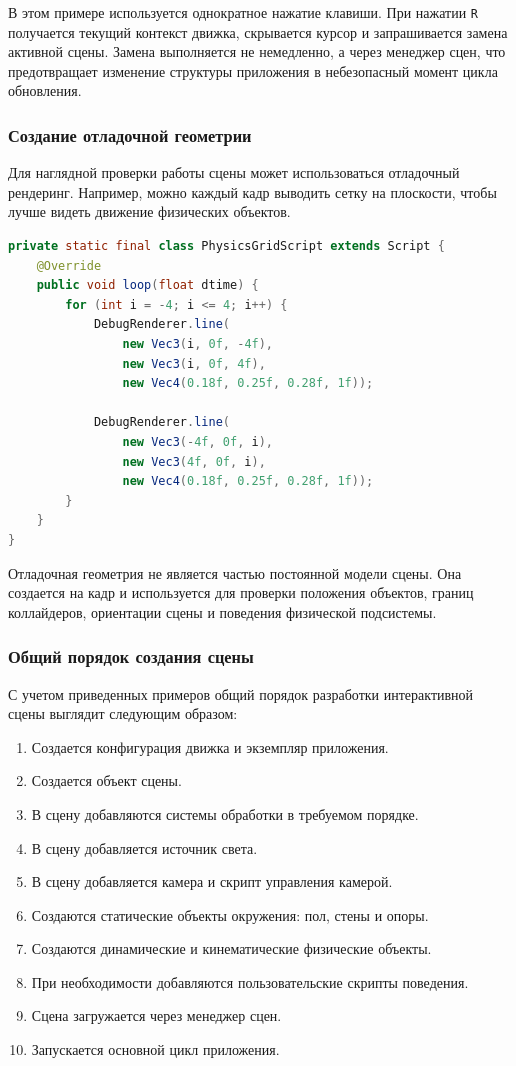 В этом примере используется однократное нажатие клавиши. При нажатии \texttt{R} получается текущий контекст движка, скрывается курсор и запрашивается замена активной сцены. Замена выполняется не немедленно, а через менеджер сцен, что предотвращает изменение структуры приложения в небезопасный момент цикла обновления.

\subsubsection{Создание отладочной геометрии}

Для наглядной проверки работы сцены может использоваться отладочный рендеринг. Например, можно каждый кадр выводить сетку на плоскости, чтобы лучше видеть движение физических объектов.

\begin{lstlisting}[language=Java,caption={Пример вывода отладочной сетки}]
private static final class PhysicsGridScript extends Script {
    @Override
    public void loop(float dtime) {
        for (int i = -4; i <= 4; i++) {
            DebugRenderer.line(
                new Vec3(i, 0f, -4f),
                new Vec3(i, 0f, 4f),
                new Vec4(0.18f, 0.25f, 0.28f, 1f));

            DebugRenderer.line(
                new Vec3(-4f, 0f, i),
                new Vec3(4f, 0f, i),
                new Vec4(0.18f, 0.25f, 0.28f, 1f));
        }
    }
}
\end{lstlisting}

Отладочная геометрия не является частью постоянной модели сцены. Она создается на кадр и используется для проверки положения объектов, границ коллайдеров, ориентации сцены и поведения физической подсистемы.

\subsubsection{Общий порядок создания сцены}

С учетом приведенных примеров общий порядок разработки интерактивной сцены выглядит следующим образом:
\begin{enumerate}
\item Создается конфигурация движка и экземпляр приложения.
\item Создается объект сцены.
\item В сцену добавляются системы обработки в требуемом порядке.
\item В сцену добавляется источник света.
\item В сцену добавляется камера и скрипт управления камерой.
\item Создаются статические объекты окружения: пол, стены и опоры.
\item Создаются динамические и кинематические физические объекты.
\item При необходимости добавляются пользовательские скрипты поведения.
\item Сцена загружается через менеджер сцен.
\item Запускается основной цикл приложения.
\end{enumerate}

